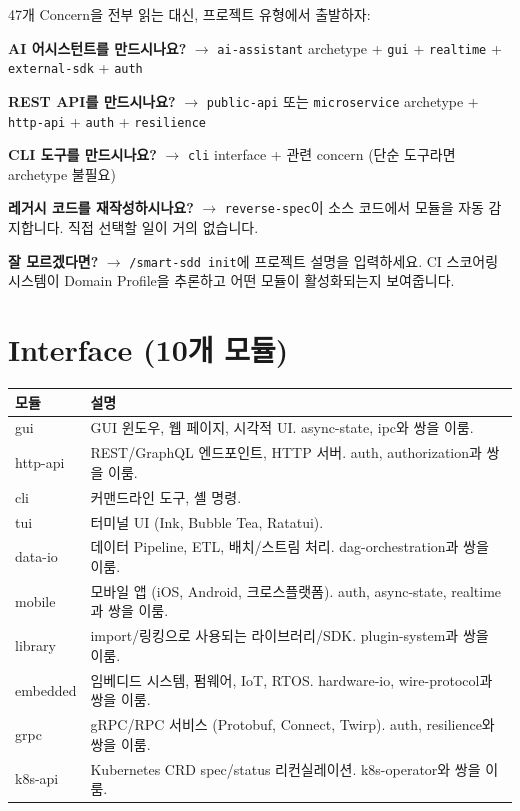 \documentclass[11pt,a4paper,openright,twoside]{report}
\begin{document}
\begin{tipbox}[내 프로젝트에 맞는 모듈 찾기]
47개 Concern을 전부 읽는 대신, 프로젝트 유형에서 출발하자:

\textbf{AI 어시스턴트를 만드시나요?} $\rightarrow$ \texttt{ai-assistant} archetype + \texttt{gui} + \texttt{realtime} + \texttt{external-sdk} + \texttt{auth}

\textbf{REST API를 만드시나요?} $\rightarrow$ \texttt{public-api} 또는 \texttt{microservice} archetype + \texttt{http-api} + \texttt{auth} + \texttt{resilience}

\textbf{CLI 도구를 만드시나요?} $\rightarrow$ \texttt{cli} interface + 관련 concern (단순 도구라면 archetype 불필요)

\textbf{레거시 코드를 재작성하시나요?} $\rightarrow$ \texttt{reverse-spec}이 소스 코드에서 모듈을 자동 감지합니다. 직접 선택할 일이 거의 없습니다.

\textbf{잘 모르겠다면?} $\rightarrow$ \texttt{/smart-sdd init}에 프로젝트 설명을 입력하세요. CI 스코어링 시스템이 Domain Profile을 추론하고 어떤 모듈이 활성화되는지 보여줍니다.
\end{tipbox}

\section{Interface (10개 모듈)}

\begin{longtable}{lp{8cm}}
\toprule
\textbf{모듈} & \textbf{설명} \\
\midrule
\endhead
gui & GUI 윈도우, 웹 페이지, 시각적 UI. async-state, ipc와 쌍을 이룸. \\
http-api & REST/GraphQL 엔드포인트, HTTP 서버. auth, authorization과 쌍을 이룸. \\
cli & 커맨드라인 도구, 셸 명령. \\
tui & 터미널 UI (Ink, Bubble Tea, Ratatui). \\
data-io & 데이터 Pipeline, ETL, 배치/스트림 처리. dag-orchestration과 쌍을 이룸. \\
mobile & 모바일 앱 (iOS, Android, 크로스플랫폼). auth, async-state, realtime과 쌍을 이룸. \\
library & import/링킹으로 사용되는 라이브러리/SDK. plugin-system과 쌍을 이룸. \\
embedded & 임베디드 시스템, 펌웨어, IoT, RTOS. hardware-io, wire-protocol과 쌍을 이룸. \\
grpc & gRPC/RPC 서비스 (Protobuf, Connect, Twirp). auth, resilience와 쌍을 이룸. \\
k8s-api & Kubernetes CRD spec/status 리컨실레이션. k8s-operator와 쌍을 이룸. \\
\bottomrule
\end{longtable}
\end{document}

